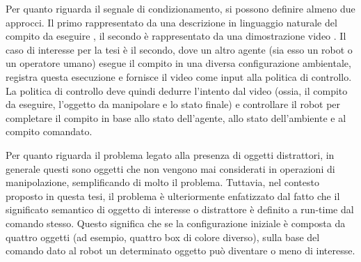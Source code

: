 Per quanto riguarda il segnale di condizionamento, si possono definire almeno due approcci. Il primo rappresentato da una descrizione in linguaggio naturale del compito da eseguire \cite{stepputtis2020language,mees2022calvin,brohan2022rt}, il secondo è rappresentato da una dimostrazione video \cite{dasari2021transformers_one_shot,mandi2022towards_more_generalizable_one_shot}.
\newline Il caso di interesse per la tesi è il secondo, dove un altro agente (sia esso un robot o un operatore umano) esegue il compito in una diversa configurazione ambientale, registra questa esecuzione e fornisce il video come input alla politica di controllo. La politica di controllo deve quindi dedurre l'intento dal video (ossia, il compito da eseguire, l'oggetto da manipolare e lo stato finale) e controllare il robot per completare il compito in base allo stato dell'agente, allo stato dell'ambiente e al compito comandato.


Per quanto riguarda il problema legato alla presenza di oggetti distrattori, in generale questi sono oggetti che non vengono mai considerati in operazioni di manipolazione, semplificando di molto il problema. Tuttavia, nel contesto proposto in questa tesi, il problema è ulteriormente enfatizzato dal fatto che il significato semantico di oggetto di interesse o distrattore  è definito a run-time dal comando stesso. Questo significa che se la configurazione iniziale è composta da quattro oggetti (ad esempio, quattro box di colore diverso), sulla base del comando dato al robot un determinato oggetto può diventare o meno di interesse.

